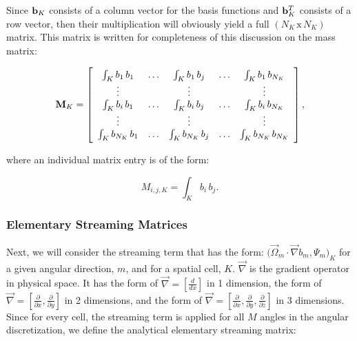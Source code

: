 Since ${\bf b}_K$ consists of a column vector for the basis functions and ${\bf b}_K^{T}$ consists of a row vector, then their multiplication will obviously yield a full $(N_K \, \text{x} \, N_K)$ matrix. This matrix is written for completeness of this discussion on the mass matrix:

\begin{equation}
\label{eq::Sn_mass_matrix_array}
{\bf M}_K =   \left[
\begin{array} {ccccc}
	\int_K b_1 \, b_1  & \ldots & \int_K b_1 \, b_j  & \ldots & \int_K b_1 \, b_{N_K} \\
	\vdots  &  & \vdots  &  & \vdots \\
	\int_K b_i \, b_1  & \ldots & \int_K b_i \, b_j  & \ldots & \int_K b_i \, b_{N_K} \\
	\vdots  &  & \vdots  &  & \vdots \\
	\int_K b_{N_K} \, b_1  & \ldots & \int_K b_{N_K} \, b_j  & \ldots & \int_K b_{N_K} \, b_{N_K} \\
\end{array}
\right] ,
\end{equation}

\noindent where an individual matrix entry is of the form:

\begin{equation}
\label{eq::Sn_mass_matrix_entry}
M_{i,j,K} =  \int_K b_i \, b_j .
\end{equation}

\subsubsection{Elementary Streaming Matrices}
\label{sec::Sn_Spatial_Matrices_Streaming}

Next, we will consider the streaming term that has the form: $ \Big( \vec{\Omega}_m \cdot \vec{\nabla}  b_m , \Psi_m  \Big)_K$ for a given angular direction, $m$, and for a spatial cell, $K$. $\vec{\nabla} $ is the gradient operator in physical space. It has the form of $\vec{\nabla} = \left[ \frac{d}{dx} \right]$ in 1 dimension, the form of $\vec{\nabla} = \left[ \frac{\partial}{\partial x} , \frac{\partial}{\partial y} \right]$ in 2 dimensions, and the form of $\vec{\nabla} = \left[ \frac{\partial}{\partial x} , \frac{\partial}{\partial y} , \frac{\partial}{\partial z} \right]$ in 3 dimensions. Since for every cell, the streaming term is applied for all $M$ angles in the angular discretization, we define the analytical elementary streaming matrix:

